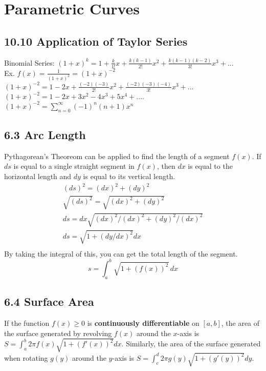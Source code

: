 \documentclass{article}
\begin{document}
    \section{Parametric Curves}
        \color{WildStrawberry}
        \subsection*{10.10 Application of Taylor Series}
            Binomial Series: $(1+x)^k = 1 + \frac{k}{1!}x + \frac{k(k-1)}{2!}x^2 + \frac{k(k-1)(k-2)}{3!}x^3 + ...$ \\
            Ex. $f(x) = \frac{1}{(1+x)^2} = (1+x)^{-2}$ \\
            $(1+x)^{-2} = 1 - 2x + \frac{(-2)(-3)}{2!}x^2  + \frac{(-2)(-3)(-4)}{3!}x^3 + ...$ \\
            $(1+x)^{-2} = 1 - 2x  + 3x^2 - 4x^3 + 5x^4 + ....$ \\
            $(1+x)^{-2} = \sum_{n=0}^{\infty} (-1)^n(n+1)x^n$ \\
        \color{OliveGreen}
        \subsection*{6.3 Arc Length}
            Pythagorean's Theoreom can be applied to find the length of a segment \(f(x)\).
            If \(ds\) is equal to a single straight segment in \(f(x)\), then  \(dx\) is equal to the horizontal length and \(dy\) is equal to its vertical length. 
            \begin{equation}
                \begin{split}
                    (ds)^2 = (dx)^2 + (dy)^2 \\
                    \sqrt{(ds)^2} = \sqrt{(dx)^2 + (dy)^2}\\
                    ds = dx  \sqrt{(dx)^2 / (dx)^2 + (dy)^2 / (dx) ^2}\\
                    ds = \sqrt{1 + (dy/dx)^2}dx\\
                \end{split}
            \end{equation}
            By taking the integral of this, you can get the total length of the segment.
            \begin{equation}
                s = \int_a^b \sqrt{1 + (f(x))^2} \, dx
            \end{equation}
        \color{Blue}
        \subsection*{6.4 Surface Area}
            If the function $f(x) \geq 0$ is \textbf{continuously differentiable} on $[a, b]$, the area of the surface generated by revolving $f(x)$ around the $x$-axis is $S = \int_{a}^{b} 2 \pi f(x) \sqrt{1 + (f'(x))^2} dx$. Similarly, the area of the surface generated when rotating $g(y)$ around the $y$-axis is $S = \int_{c}^{d} 2 \pi g(y) \sqrt{1 + (g'(y))^2} dy$.
        \color{Black}
\end{document}
